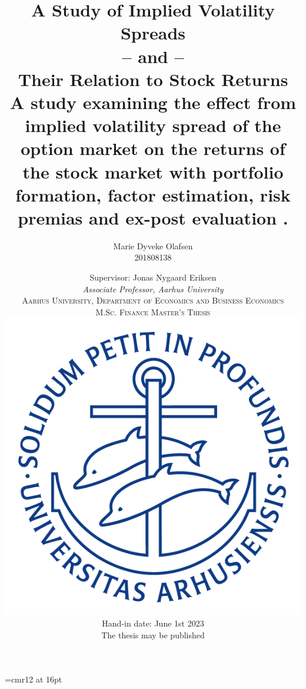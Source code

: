 \font\myfont=cmr12 at 16pt

\newcommand\charactersnofigs{0}
\newcommand\figstables{0}
\newcommand\charspertable{800}
\newcommand\charsperpage{2400}
\newcommand\characterstotal{\the\numexpr(\charactersnofigs+\figstables*\charspertable)  \relax}
\newcommand\pagestotal{\the\numexpr(\characterstotal/\charsperpage)  \relax}

\title{
   {A Study of Implied Volatility Spreads \\
   	{\large -- and --}\\
   	Their Relation to Stock Returns} \\
    \large{A study examining the effect from implied volatility spread of the option market on the returns of the stock market with portfolio formation, factor estimation, risk premias and ex-post evaluation%
    	.}
	}
    \date{\bigskip Supervisor: Jonas Nygaard Eriksen \\ [-0.2em]
	\textit{Associate Professor, Aarhus University} \\
	\bigskip \bigskip
	\textsc{Aarhus University, Department of Economics and Business Economics} \\
	\textsc{M.Sc. Finance Master's Thesis}	\\
	\bigskip \bigskip
	\protect	\includegraphics[scale=0.35]{./Pictures/ausegl_blaa} \\
	\bigskip
	Hand-in date: June 1st 2023\\ 
	The thesis may be published \\
}
	
	\author{
	Marie Dyveke Olafsen \\ [-0.2em]
	201808138
	}
\maketitle
\thispagestyle{empty}